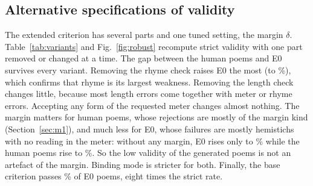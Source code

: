 \subsection{Alternative specifications of validity}
The extended criterion has several parts and one tuned setting, the margin $\delta$. Table~\ref{tab:variants} and
Fig.~\ref{fig:robust} recompute strict validity with one part removed or changed at a time. The gap between the human
poems and E0 survives every variant. Removing the rhyme check raises E0 the most (to \%), which
confirms that rhyme is its largest weakness. Removing the length check changes little, because most length errors come
together with meter or rhyme errors. Accepting any form of the requested meter changes almost nothing. The margin
matters for human poems, whose rejections are mostly of the margin kind (Section~\ref{sec:m1}), and much less for E0,
whose failures are mostly hemistichs with no reading in the meter: without any margin, E0 rises only to
\% while the human poems rise to \%. So the low validity of the generated poems is
not an artefact of the margin. Binding mode is stricter for both. Finally, the base criterion passes
\% of E0 poems, eight times the strict rate.

